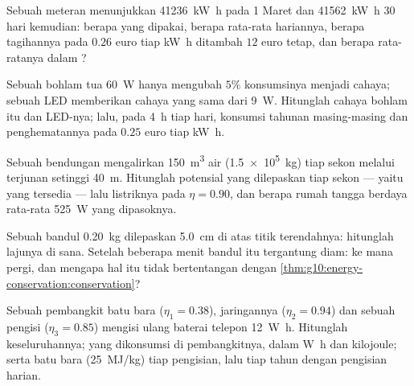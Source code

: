 \begin{exercise}[$\star\star$]\label{exo:g10:energy-conservation:8}
Sebuah meteran menunjukkan \qty{41236}{kW.h} pada 1 Maret dan
\qty{41562}{kW.h} 30 hari kemudian: berapa  yang dipakai, berapa
rata-rata hariannya, berapa tagihannya pada $0.26$ euro tiap
\unit{kW.h} ditambah $12$ euro tetap, dan berapa  rata-ratanya
dalam ?
\end{exercise}

\begin{exercise}[$\star\star$]\label{exo:g10:energy-conservation:9}
Sebuah bohlam tua \qty{60}{W} hanya mengubah $5\%$ konsumsinya menjadi
cahaya; sebuah LED memberikan cahaya yang sama dari \qty{9}{W}.
Hitunglah  cahaya bohlam itu dan  LED-nya; lalu, pada
\qty{4}{h} tiap hari, konsumsi tahunan masing-masing dan penghematannya
pada $0.25$ euro tiap \unit{kW.h}.
\end{exercise}

\begin{exercise}[$\star\star$]\label{exo:g10:energy-conservation:10}
Sebuah bendungan mengalirkan \qty{150}{m^3} air (\qty{1.5e5}{kg}) tiap
sekon melalui terjunan setinggi \qty{40}{m}. Hitunglah  potensial
yang dilepaskan tiap sekon --- yaitu  yang tersedia --- lalu 
listriknya pada $\eta = 0.90$, dan berapa rumah tangga
berdaya rata-rata \qty{525}{W} yang dipasoknya.
\end{exercise}

\begin{exercise}[$\star\star$]\label{exo:g10:energy-conservation:11}
Sebuah bandul \qty{0.20}{kg} dilepaskan \qty{5.0}{cm} di atas titik
terendahnya: hitunglah lajunya di sana. Setelah beberapa menit bandul
itu tergantung diam: ke mana  pergi, dan mengapa hal itu tidak
bertentangan dengan
\cref{thm:g10:energy-conservation:conservation}?
\end{exercise}

\begin{exercise}[$\star\star\star$]\label{exo:g10:energy-conservation:12}
Sebuah pembangkit batu bara ($\eta_1 = 0.38$), jaringannya
($\eta_2 = 0.94$) dan sebuah pengisi  ($\eta_3 = 0.85$) mengisi
ulang baterai telepon \qty{12}{W.h}. Hitunglah 
keseluruhannya;  yang dikonsumsi di pembangkitnya, dalam
\unit{W.h} dan kilojoule; serta batu bara (\qty{25}{MJ/kg}) tiap
pengisian, lalu tiap tahun dengan pengisian harian.
\end{exercise}

